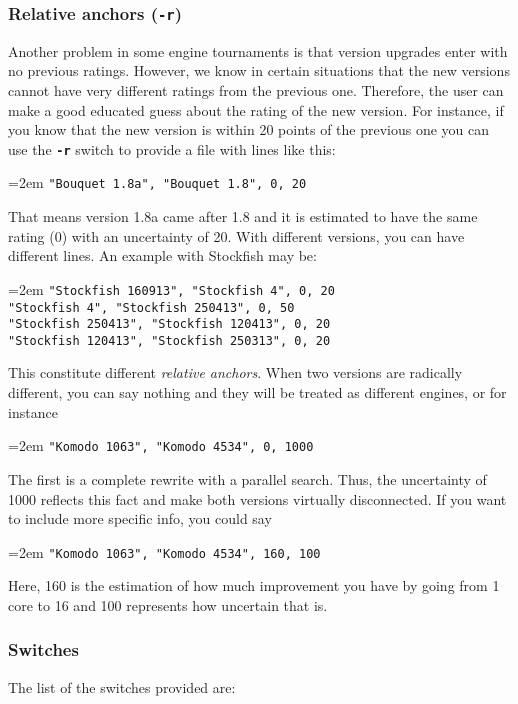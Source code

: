 \documentclass[12pt]{article}
\newcommand{\swtch} [1] {\texttt{\textbf{#1}}}
\newcommand{\cmdln}[1]{
	\par
	\begingroup
		\leftskip=2em
		\addtolength{\rightskip}{0em}
		\noindent \small{\texttt{#1}}
		\par
	\endgroup
}
\newcommand{\inctxt}[1]{
	\begingroup
    \fontsize{9pt}{11pt}\selectfont
		 
	\endgroup
}
\begin{document}
\subsubsection*{Relative anchors (\swtch{-r})}

Another problem in some engine tournaments is that version upgrades enter with no previous ratings. 
However, we know in certain situations that the new versions cannot have very different ratings from the previous one. 
Therefore, the user can make a good educated guess about the rating of the new version. 
For instance, if you know that the new version is within 20 points of the previous one you can use the \swtch{-r} switch to provide a file with lines like this:

\cmdln{"Bouquet 1.8a",    "Bouquet 1.8",   0, 20}

That means version 1.8a came after 1.8 and it is estimated to have the same rating (0) with an uncertainty of 20. 
With different versions, you can have different lines. An example with Stockfish may be:

\cmdln{"Stockfish 160913", "Stockfish 4",        0, 20\\
"Stockfish 4",      "Stockfish 250413",   0, 50\\
"Stockfish 250413", "Stockfish 120413",   0, 20\\
"Stockfish 120413", "Stockfish 250313",   0, 20}

This constitute different \textit{relative anchors}.
When two versions are radically different, you can say nothing and they will be treated as different engines, or for instance

\cmdln{"Komodo 1063",      "Komodo 4534",        0, 1000}

The first is a complete rewrite with a parallel search. Thus, the uncertainty of 1000 reflects this fact and make both versions virtually disconnected. 
If you want to include more specific info, you could say

\cmdln{"Komodo 1063",      "Komodo 4534",        160, 100}

Here, 160 is the estimation of how much improvement you have by going from 1 core to 16 and 100 represents how uncertain that is. 

\subsubsection*{Switches}

The list of the switches provided are:
\inctxt{tmp-switches.txt}
\end{document}

